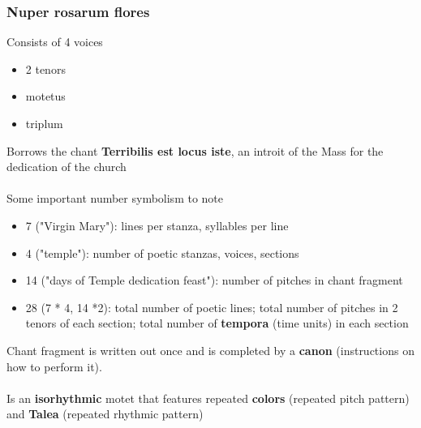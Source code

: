 \documentclass{article}
\begin{document}
  \subsubsection{Nuper rosarum flores}
  Consists of 4 voices
  \begin{itemize}
    \item 2 tenors
    \item motetus
    \item triplum
  \end{itemize}
  Borrows the chant \textbf{Terribilis est locus iste}, an introit of the Mass for the dedication of the church \\ \\
  Some important number symbolism to note
  \begin{itemize}
    \item 7 ("Virgin Mary"): lines per stanza, syllables per line
    \item 4 ("temple"): number of poetic stanzas, voices, sections
    \item 14 ("days of Temple dedication feast"): number of pitches in chant fragment
    \item 28 (7 * 4, 14 *2): total number of poetic lines; total number of pitches in 2 tenors of each section; total number of \textbf{tempora} (time units) in each section
  \end{itemize}
  Chant fragment is written out once and is completed by a \textbf{canon} (instructions on how to perform it). \\ \\
  Is an \textbf{isorhythmic} motet that features repeated \textbf{colors} (repeated pitch pattern) and \textbf{Talea} (repeated rhythmic pattern)
\end{document}
